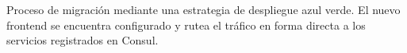 \label{fig:femigracion}
\captionStyle
Proceso de migración mediante una estrategia de despliegue azul
verde. El nuevo frontend se encuentra configurado y rutea el tráfico
en forma directa a los servicios registrados en Consul.
